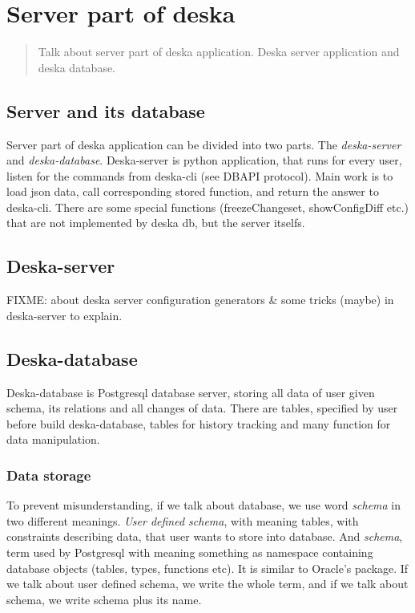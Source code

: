 \documentclass[deska]{subfiles}
\begin{document}
\chapter{Server part of deska}
\label{sec:deska-server}

\begin{abstract}
Talk about server part of deska application. Deska server application and deska database.
\end{abstract}

\section{Server and its database}
Server part of deska application can be divided into two parts. The {\em deska-server} and {\em deska-database}.
Deska-server is python application, that runs for every user, listen for the commands from deska-cli (see DBAPI protocol).
Main work is to load json data, call corresponding stored function, and return the answer to deska-cli.
There are some special functions (freezeChangeset, showConfigDiff etc.) that are not implemented by deska db, but the server itselfs.

\section{Deska-server}
FIXME: about deska server configuration generators & some tricks (maybe) in deska-server to explain.

\section{Deska-database}
Deska-database is Postgresql database server, storing all data of user given schema, its relations and all changes of data.
There are tables, specified by user before build deska-database, tables for history tracking and many function for data manipulation.

\subsection{Data storage}
To prevent misunderstanding, if we talk about database, we use word {\em schema} in two different meanings. {\em User defined schema},
with meaning tables, with constraints describing data, that user wants to store into database. And {\em schema}, term used by
Postgresql with meaning something as namespace containing database objects (tables, types, functions etc).
It is similar to Oracle's package. If we talk about user defined schema, we write the whole term, and if we talk about schema, we write
schema plus its name.
\end{document}
